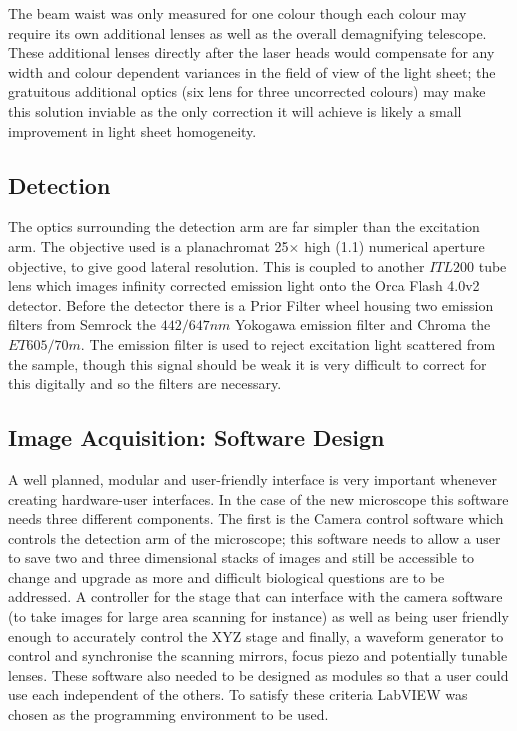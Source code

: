 \documentclass[10pt,a4paper]{report}
\begin{document}
\begin{spacing}{1.5}
The beam waist was only measured for one colour though each colour may require its own additional lenses as well as the overall demagnifying telescope. These additional lenses directly after the laser heads would compensate for any width and colour dependent variances in the field of view of the light sheet; the gratuitous additional optics (six lens for three uncorrected colours) may make this solution inviable as the only correction it will achieve is likely a small improvement in light sheet homogeneity.

\subsection{Detection}

The optics surrounding the detection arm are far simpler than the excitation arm. The objective used is a planachromat \SI{25}{}$\times$ high (\SI{1.1}{}) numerical aperture objective, to give good lateral resolution. This is coupled to another $ITL200$ tube lens which images infinity corrected emission light onto the Orca Flash 4.0v2 detector. Before the detector there is a Prior Filter wheel housing two emission filters from Semrock the $442/647 nm$ Yokogawa emission filter and Chroma the $ET605/70m$. The emission filter is used to reject excitation light scattered from the sample, though this signal should be weak it is very difficult to correct for this digitally and so the filters are necessary.

\subsection{Image Acquisition: Software Design}

A well planned, modular and user-friendly interface is very important whenever creating hardware-user interfaces. In the case of the new microscope this software needs three different components. The first is the Camera control software which controls the detection arm of the microscope; this software needs to allow a user to save two and three dimensional stacks of images and still be accessible to change and upgrade as more and difficult biological questions are to be addressed. A controller for the stage that can interface with the camera software (to take images for large area scanning for instance) as well as being user friendly enough to accurately control the XYZ stage and finally, a waveform generator to control and synchronise the scanning mirrors, focus piezo and potentially tunable lenses. These software also needed to be designed as modules so that a user could use each independent of the others. To satisfy these criteria LabVIEW was chosen as the programming environment to be used.


\end{spacing}
\end{document}
